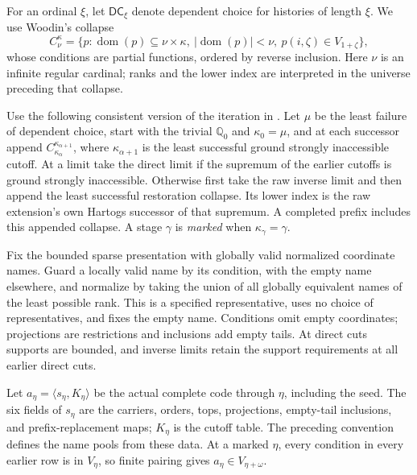\documentclass[11pt,a4paper]{amsart}
\newcommand{\DC}{\mathsf{DC}}
\theoremstyle{plain}
\theoremstyle{definition}
\theoremstyle{remark}
\begin{document}
For an ordinal $\xi$, let $\DC_\xi$ denote dependent choice for
histories of length $\xi$.  We use Woodin's collapse
\[
C_\nu^\kappa=\{p:\operatorname{dom}(p)\subseteq\nu\times\kappa,\
 |\operatorname{dom}(p)|<\nu,\ p(i,\zeta)\in V_{1+\zeta}\},
\]
whose conditions are partial functions, ordered by reverse inclusion.
Here $\nu$ is an infinite regular cardinal; ranks and the lower
index are interpreted in the universe preceding that collapse.

Use the following consistent version of the iteration in
\cite[pp.~323--324]{Woodin}.  Let $\mu$ be the least failure of dependent
choice, start with the trivial $\mathbb Q_0$ and $\kappa_0=\mu$,
and at each successor append $C_{\kappa_\alpha}^{\kappa_{\alpha+1}}$,
where $\kappa_{\alpha+1}$ is the least successful ground strongly
inaccessible cutoff.  At a limit take the direct limit if the
supremum of the earlier cutoffs is ground strongly inaccessible.
Otherwise first take the raw inverse limit and then append the
least successful restoration collapse.  Its lower index is the
raw extension's own Hartogs successor of that supremum.
A completed prefix includes this appended collapse.
A stage $\gamma$ is \emph{marked} when $\kappa_\gamma=\gamma$.

Fix the bounded sparse presentation with globally valid normalized
coordinate names.  Guard a locally valid name by its condition, with
the empty name elsewhere, and normalize by taking the union of all
globally equivalent names of the least possible rank.  This is a
specified representative, uses no choice of representatives, and
fixes the empty name.  Conditions omit empty coordinates; projections
are restrictions and inclusions add empty tails.  At direct cuts
supports are bounded, and inverse limits retain the support
requirements at all earlier direct cuts.

Let $a_\eta=\langle s_\eta,K_\eta\rangle$ be the actual complete code
through $\eta$, including the seed.  The six fields of $s_\eta$
are the carriers, orders, tops, projections, empty-tail inclusions,
and prefix-replacement maps; $K_\eta$ is the cutoff table.
The preceding convention defines the name pools from these data.
At a marked $\eta$, every condition in every earlier row is in
$V_\eta$, so finite pairing gives $a_\eta\in V_{\eta+\omega}$.
\end{document}
